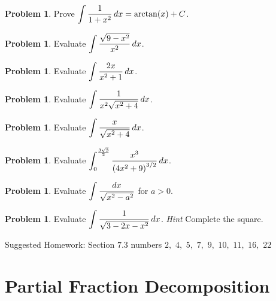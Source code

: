 \documentclass[letterpaper, twoside, 12pt]{book}
\theoremstyle{definition}
\theoremstyle{definition}
\newtheorem{problem}[theorem]{Problem}
\newcommand{\ds}{\ensuremath{\displaystyle}}
\begin{document}
\begin{problem}
 Prove $\ds \int \frac{1}{1+x^2}\, dx = \arctan(x)+C$.
\end{problem}

\vfill

\begin{problem}
 Evaluate $\ds \int \frac{\sqrt{9-x^2}}{x^2} \, dx$.
\end{problem}

\vfill

\newpage

\begin{problem}
 Evaluate $\ds \int \frac{2x}{x^2+1}\, dx$.
\end{problem}

\vfill

\begin{problem}
 Evaluate $\ds \int \frac{1}{x^2\sqrt{x^2+4}} \, dx$.
\end{problem}

\vfill

\newpage

\begin{problem}
 Evaluate $\ds \int \frac{x}{\sqrt{x^2 + 4}} \, dx$.
\end{problem}

\vfill

\begin{problem}
 Evaluate $\ds \int_0^{\frac{3\sqrt{3}}{2}} \frac{x^3}{\left(4x^2+9\right)^{3/2}} \, dx$.
\end{problem}

\vfill

\newpage

\begin{problem}
 Evaluate $\ds \int \frac{dx}{\sqrt{x^2-a^2}}$ for $a >0$.
\end{problem}

\vfill

\begin{problem}
 Evaluate $\ds \int \frac{1}{\sqrt{3-2x-x^2}} \, dx$.  \emph{Hint} Complete the square.
\end{problem}

\vfill

\noindent Suggested Homework: Section $7.3$ numbers $2,$ $4,$ $5,$ $7,$ $9,$ $10,$ $11,$ $16,$ $22$

\newpage

\section{Partial Fraction Decomposition}
\end{document}
